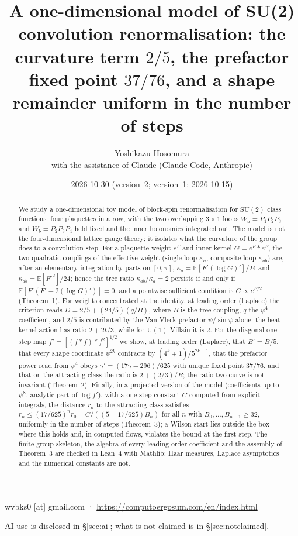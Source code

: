 \documentclass[11pt,a4paper]{article}
\title{A one-dimensional model of SU(2) convolution renormalisation: the curvature term $2/5$, the prefactor fixed point $37/76$, and a shape remainder uniform in the number of steps}
\author{Yoshikazu Hosomura\\[.3em]\normalsize with the assistance of Claude (Claude Code, Anthropic)}
\date{2026-10-30 (version~2; version~1: 2026-10-15)}
\theoremstyle{definition}
\theoremstyle{remark}
\newcommand{\E}{\mathbb{E}}
\newcommand{\SU}{\mathrm{SU}(2)}
\begin{document}
\maketitle
\begin{center}\small wvbks0 [at] gmail.com · \url{https://computoergosum.com/en/index.html}\end{center}
\begin{center}\small AI use is disclosed in \S\ref{sec:ai}; what is not claimed is in \S\ref{sec:notclaimed}.\end{center}

\begin{abstract}
We study a one-dimensional toy model of block-spin renormalisation for $\SU$ class functions: four plaquettes in a row, with the two overlapping $3\times1$ loops $W_a=P_1P_2P_3$ and $W_b=P_2P_3P_4$ held fixed and the inner holonomies integrated out.
The model is not the four-dimensional lattice gauge theory; it isolates what the curvature of the group does to a convolution step.
For a plaquette weight $e^{F}$ and inner kernel $G=e^F*e^F$, the two quadratic couplings of the effective weight (single loop $\kappa_a$, composite loop $\kappa_{ab}$) are, after an elementary integration by parts on $[0,\pi]$, $\kappa_a=\E[F'(\log G)']/24$ and $\kappa_{ab}=\E[F'^2]/24$; hence the tree ratio $\kappa_{ab}/\kappa_a=2$ persists if and only if $\E[F'(F'-2(\log G)')]=0$, and a pointwise sufficient condition is $G\propto e^{F/2}$ (Theorem~1).
For weights concentrated at the identity, at leading order (Laplace) the criterion reads $D=2/5+(24/5)(q/B)$, where $B$ is the tree coupling, $q$ the $\psi^4$ coefficient, and $2/5$ is contributed by the Van Vleck prefactor $\psi/\sin\psi$ alone; the heat-kernel action has ratio $2+2t/3$, while for $\mathrm{U}(1)$ Villain it is $2$.
For the diagonal one-step map $f'=[(f*f)*f^2]^{1/2}$ we show, at leading order (Laplace), that $B'=B/5$, that every shape coordinate $\psi^{2k}$ contracts by $(4^k+1)/5^{2k-1}$, that the prefactor power read from $\psi^4$ obeys $\gamma'=(17\gamma+296)/625$ with unique fixed point $37/76$, and that on the attracting class the ratio is $2+(2/3)/B$; the ratio-two curve is not invariant (Theorem~2).
Finally, in a projected version of the model (coefficients up to $\psi^8$, analytic part of $\log f'$), with a one-step constant $C$ computed from explicit integrals, the distance $r_n$ to the attracting class satisfies $r_n\le(17/625)^n r_0+C/((5-17/625)B_n)$ for all $n$ with $B_0,\dots,B_{n-1}\ge32$, uniformly in the number of steps (Theorem~3); a Wilson start lies outside the box where this holds and, in computed flows, violates the bound at the first step.
The finite-group skeleton, the algebra of every leading-order coefficient and the assembly of Theorem~3 are checked in Lean~4 with Mathlib; Haar measures, Laplace asymptotics and the numerical constants are not.
\end{abstract}
\end{document}
